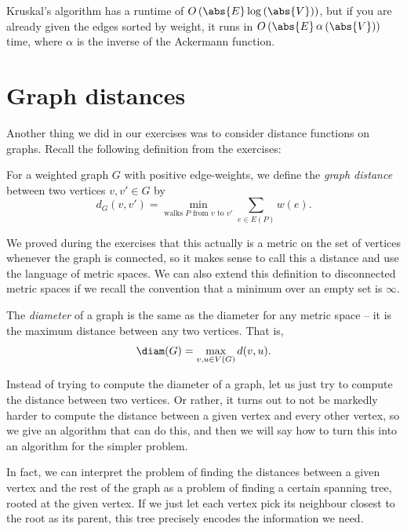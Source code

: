 \documentclass[nobib]{tufte-handout}
\begin{document}
\begin{remark}
  Kruskal's algorithm has a runtime of $O\left(\abs{E}\log\left(\abs{V}\right)\right)$, but if you are already given the edges sorted by weight, it runs in $O\left(\abs{E}\mathop{\alpha}\left(\abs{V}\right)\right)$ time, where $\alpha$ is the inverse of the Ackermann function.
\end{remark}

\section{Graph distances}

Another thing we did in our exercises was to consider distance functions on graphs. Recall the following definition from the exercises:

\begin{definition}
  For a weighted graph $G$ with positive edge-weights, we define the \emph{graph distance} between two vertices $v, v' \in G$ by
  $$d_G(v, v') = \min_{\text{walks }P\text{ from }v\text{ to }v'} \sum_{e \in E(P)} w(e).$$
\end{definition}

We proved during the exercises that this actually is a metric on the set of vertices whenever the graph is connected, so it makes sense to call this a distance and use the language of metric spaces. We can also extend this definition to disconnected metric spaces if we recall the convention that a minimum over an empty set is $\infty$.

\begin{definition}
  The \emph{diameter} of a graph is the same as the diameter for any metric space -- it is the maximum distance between any two vertices. That is,
  $$\diam(G) = \max_{v, u \in V(G)} d(v,u).$$
\end{definition}

Instead of trying to compute the diameter of a graph, let us just try to compute the distance between two vertices. Or rather, it turns out to not be markedly harder to compute the distance between a given vertex and every other vertex, so we give an algorithm that can do this, and then we will say how to turn this into an algorithm for the simpler problem.

In fact, we can interpret the problem of finding the distances between a given vertex and the rest of the graph as a problem of finding a certain spanning tree, rooted at the given vertex. If we just let each vertex pick its neighbour closest to the root as its parent, this tree precisely encodes the information we need.
\end{document}
